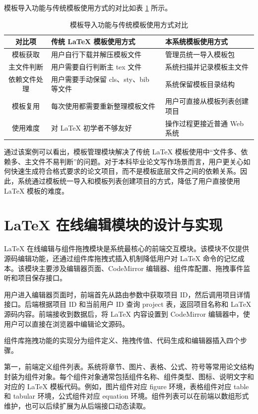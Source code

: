 \documentclass{xduugthesis}
\begin{document}
模板导入功能与传统模板使用方式的对比如表 \ref{tab:template-compare} 所示。

\begin{table}[!ht]
    \centering
    \caption{模板导入功能与传统模板使用方式对比}
    \label{tab:template-compare}
    \begin{tabular}{|c|p{5cm}|p{5cm}|}
        \hline
        对比项 & 传统 LaTeX 模板使用方式 & 本系统模板使用方式 \\
        \hline
        模板获取 & 用户自行下载并解压模板文件 & 管理员统一导入模板包 \\
        \hline
        主文件判断 & 用户需要自行判断主 tex 文件 & 系统扫描并记录模板主文件 \\
        \hline
        依赖文件处理 & 用户需要手动保留 cls、sty、bib 等文件 & 系统保留模板目录结构 \\
        \hline
        模板复用 & 每次使用都需要重新整理模板文件 & 用户可直接从模板列表创建项目 \\
        \hline
        使用难度 & 对 LaTeX 初学者不够友好 & 操作过程更接近普通 Web 系统 \\
        \hline
    \end{tabular}
\end{table}

通过该案例可以看出，模板管理模块解决了传统 LaTeX 模板使用中“文件多、依赖多、主文件不易判断”的问题。对于本科毕业论文写作场景而言，用户更关心如何快速生成符合格式要求的论文项目，而不是模板底层文件之间的依赖关系。因此，系统通过模板统一导入和模板列表创建项目的方式，降低了用户直接使用 LaTeX 模板的难度。

\section{LaTeX 在线编辑模块的设计与实现}
LaTeX 在线编辑与组件拖拽模块是系统最核心的前端交互模块。该模块不仅提供源码编辑功能，还通过组件库拖拽式插入机制降低用户对 LaTeX 命令的记忆成本。该模块主要涉及编辑器页面、CodeMirror 编辑器、组件库配置、拖拽事件监听和项目保存接口。

用户进入编辑器页面时，前端首先从路由参数中获取项目 ID，然后调用项目详情接口。后端根据项目 ID 和当前用户 ID 查询 project 表，返回项目名称和 LaTeX 源码内容。前端接收到数据后，将 LaTeX 内容设置到 CodeMirror 编辑器中，使用户可以直接在浏览器中编辑论文源码。

组件库拖拽功能的实现分为组件定义、拖拽传值、代码生成和编辑器插入四个步骤。

第一，前端定义组件列表。系统将章节、图片、表格、公式、符号等常用论文结构封装为组件对象。每个组件对象通常包括组件名称、组件类型、图标、说明文字和对应的 LaTeX 模板代码。例如，图片组件对应 figure 环境，表格组件对应 table 和 tabular 环境，公式组件对应 equation 环境。组件列表可以在前端以数组形式维护，也可以后续扩展为从后端接口动态读取。
\end{document}
